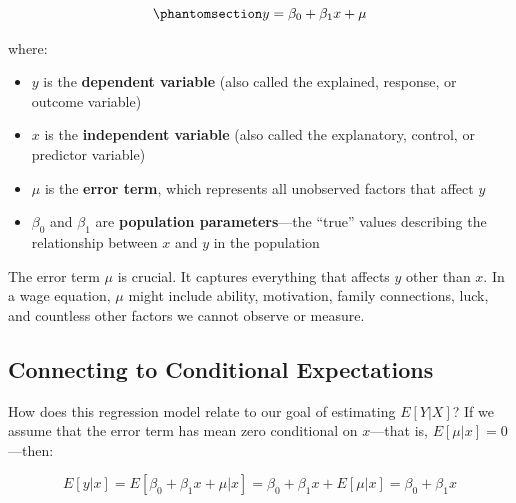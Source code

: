 \documentclass[
  letterpaper,
  DIV=11,
  numbers=noendperiod]{scrreprt}
\providecommand{\tightlist}{%
  \setlength{\itemsep}{0pt}\setlength{\parskip}{0pt}}
\begin{document}
\begin{equation}\protect\phantomsection\label{eq-pop-reg}{
y = \beta_0 + \beta_1 x + \mu
}\end{equation}

where:

\begin{itemize}
\tightlist
\item
  \(y\) is the \textbf{dependent variable} (also called the explained,
  response, or outcome variable)
\item
  \(x\) is the \textbf{independent variable} (also called the
  explanatory, control, or predictor variable)
\item
  \(\mu\) is the \textbf{error term}, which represents all unobserved
  factors that affect \(y\)
\item
  \(\beta_0\) and \(\beta_1\) are \textbf{population parameters}---the
  ``true'' values describing the relationship between \(x\) and \(y\) in
  the population
\end{itemize}

\begin{tcolorbox}[enhanced jigsaw, arc=.35mm, bottomrule=.15mm, bottomtitle=1mm, breakable, colback=white, colbacktitle=quarto-callout-note-color!10!white, colframe=quarto-callout-note-color-frame, coltitle=black, left=2mm, leftrule=.75mm, opacityback=0, opacitybacktitle=0.6, rightrule=.15mm, title=\textcolor{quarto-callout-note-color}{\faInfo}\hspace{0.5em}{The Error Term}, titlerule=0mm, toprule=.15mm, toptitle=1mm]

The error term \(\mu\) is crucial. It captures everything that affects
\(y\) other than \(x\). In a wage equation, \(\mu\) might include
ability, motivation, family connections, luck, and countless other
factors we cannot observe or measure.

\end{tcolorbox}

\subsection{Connecting to Conditional
Expectations}\label{connecting-to-conditional-expectations}

How does this regression model relate to our goal of estimating
\(E[Y|X]\)? If we assume that the error term has mean zero conditional
on \(x\)---that is, \(E[\mu | x] = 0\)---then:

\[
E[y | x] = E[\beta_0 + \beta_1 x + \mu | x] = \beta_0 + \beta_1 x + E[\mu | x] = \beta_0 + \beta_1 x
\]
\end{document}

